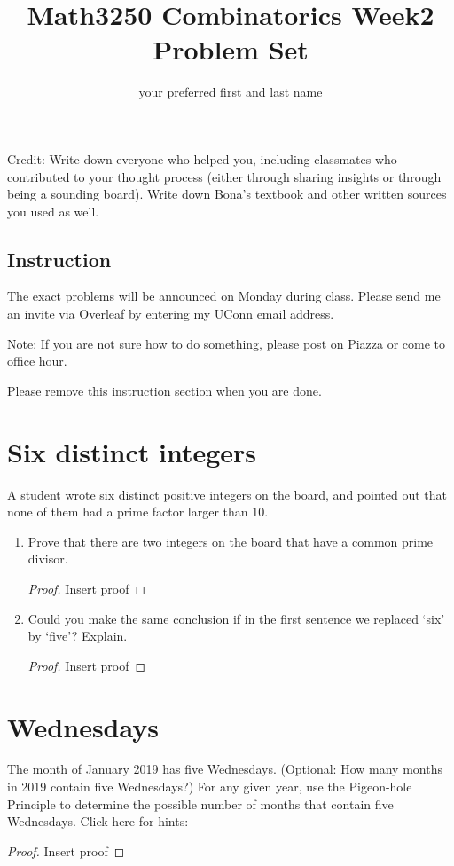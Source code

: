 \documentclass[12pt]{amsart}
\title{Math3250 Combinatorics Week2 Problem Set}
\author{your preferred first and last name}
\date{}
\begin{document}
\maketitle


\noindent Credit: Write down everyone who helped you, including classmates who contributed to your thought process (either through sharing insights or through being a sounding board). Write down Bona's textbook and other written sources you used as well.

\subsection*{Instruction}
The exact problems will be announced on Monday during class. 
Please send me an invite via Overleaf by entering my UConn email address.

Note: If you are not sure how to do something, please post on Piazza or come to office hour.

Please remove this instruction section when you are done.

\section{Six distinct integers}
A student wrote six distinct positive integers on the board, and pointed out that none of them had a prime factor larger than $10$.
\begin{enumerate}
    \item 
    Prove that there are two integers on the board that have a common prime divisor.
    \begin{proof}
    Insert proof
    \end{proof}
    \item 
    Could you make the same conclusion if in the first sentence we replaced `six' by `five'? Explain.
    \begin{proof}
    Insert proof
    \end{proof}
\end{enumerate}

\section{Wednesdays}\label{sec:wednesdays} 
The month of January 2019 has five Wednesdays. (Optional: How many months in 2019 contain five Wednesdays?) For any given year, use the Pigeon-hole Principle to determine the possible number of months that contain five Wednesdays.
Click here for hints: %
\begin{proof}
Insert proof
\end{proof}
\end{document}
